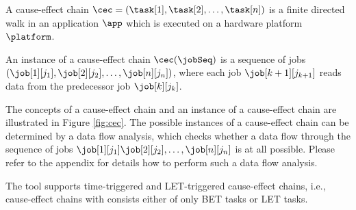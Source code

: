\begin{definition}
A cause-effect chain  
$\cec=(\task[1], \task[2], \ldots, \task[n])$ 
is a finite directed walk in an application $\app$ which is executed on a hardware platform $\platform$.
\end{definition}

\begin{definition}
An instance of a cause-effect chain $\cec(\jobSeq)$ 
is a sequence of jobs
$\left(\job[1][j_1], \job[2][j_2], \ldots, \job[n][j_n]\right)$, where each job $\job[{k+1}][j_{k+1}]$ reads data from the predecessor job $\job[k][j_{k}]$.
\end{definition}
%
The concepts of a cause-effect chain and an instance of a cause-effect chain are illustrated in Figure \ref{fig:cec}.
The possible instances of a cause-effect chain can be determined by a data flow analysis, which checks whether a data flow through the sequence of jobs $\job[1][j_1] \job[2][j_2], \ldots, \job[n][j_n]$ is at all possible. 
Please refer to the appendix for details how to perform such a data flow analysis.
\bigskip

The tool \Tool supports time-triggered and LET-triggered cause-effect chains, i.e., cause-effect chains with consists either of only BET tasks or LET tasks.


